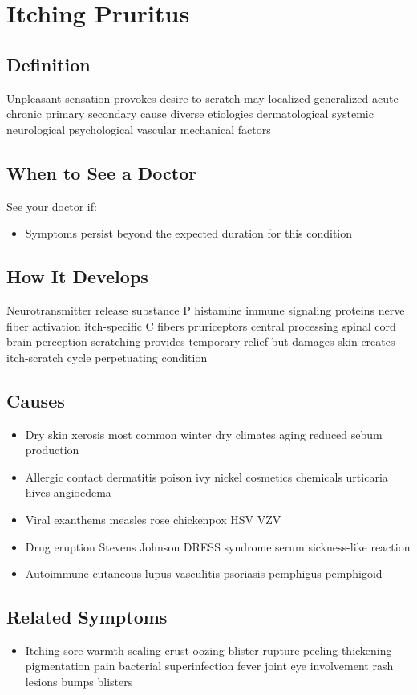 \chapter{Itching Pruritus}

\section*{Definition}
Unpleasant sensation provokes desire to scratch may localized generalized acute chronic primary secondary cause diverse etiologies dermatological systemic neurological psychological vascular mechanical factors

\section*{When to See a Doctor}
See your doctor if:
\begin{itemize}
  \item Symptoms persist beyond the expected duration for this condition
\end{itemize}

\section*{How It Develops}
Neurotransmitter release substance P histamine immune signaling proteins nerve fiber activation itch-specific C fibers pruriceptors central processing spinal cord brain perception scratching provides temporary relief but damages skin creates itch-scratch cycle perpetuating condition

\section*{Causes}
\begin{itemize}
  \item Dry skin xerosis most common winter dry climates aging reduced sebum production
  \item Allergic contact dermatitis poison ivy nickel cosmetics chemicals urticaria hives angioedema
  \item Viral exanthems measles rose chickenpox HSV VZV
  \item Drug eruption Stevens Johnson DRESS syndrome serum sickness-like reaction
  \item Autoimmune cutaneous lupus vasculitis psoriasis pemphigus pemphigoid
\end{itemize}

\section*{Related Symptoms}
\begin{itemize}
  \item Itching sore warmth scaling crust oozing blister rupture peeling thickening pigmentation pain bacterial superinfection fever joint eye involvement rash lesions bumps blisters
\end{itemize}

